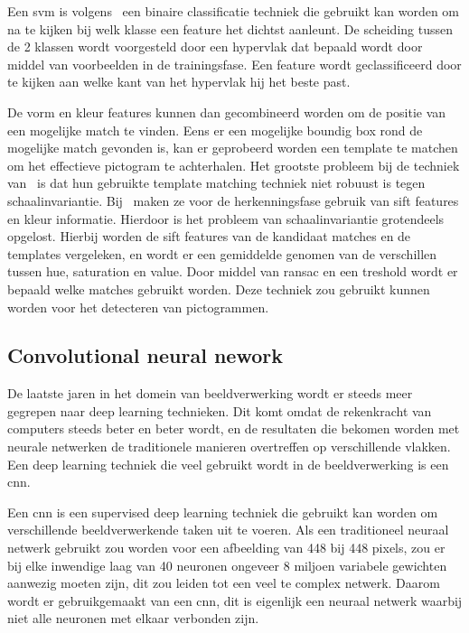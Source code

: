             Een \gls{svm} is volgens~\cite{fradkin2006support} een binaire classificatie techniek die gebruikt kan worden om na te kijken bij welk klasse een feature het dichtst aanleunt.
            De scheiding tussen de 2 klassen wordt voorgesteld door een hypervlak dat bepaald wordt door middel van voorbeelden in de trainingsfase.
            Een feature wordt geclassificeerd door te kijken aan welke kant van het hypervlak hij het beste past.

            De vorm en kleur features kunnen dan gecombineerd worden om de positie van een mogelijke match te vinden. Eens er een mogelijke boundig box rond de mogelijke match gevonden is,
            kan er geprobeerd worden een template te matchen om het effectieve pictogram te achterhalen. Het grootste probleem bij de techniek van~\cite{Fang2003} is
            dat hun gebruikte template matching techniek niet robuust is tegen schaalinvariantie.
            Bij~\cite{Zabihi2017} maken ze voor de herkenningsfase gebruik van \gls{sift}\cite{Lowe1999} features en kleur informatie.
            Hierdoor is het probleem van schaalinvariantie grotendeels opgelost.
            Hierbij worden de \gls{sift} features van de kandidaat matches en de templates vergeleken, en wordt er een gemiddelde genomen van de verschillen tussen hue, saturation en value.
            Door middel van \gls{ransac} en een treshold wordt er bepaald welke matches gebruikt worden. Deze techniek zou gebruikt kunnen worden voor het detecteren van pictogrammen.

        
        \subsection{Convolutional neural nework} \label{sec:yolo}
            De laatste jaren in het domein van beeldverwerking wordt er steeds meer gegrepen naar deep learning technieken.
            Dit komt omdat de rekenkracht van computers steeds beter en beter wordt, en de resultaten die bekomen worden met neurale netwerken de traditionele manieren overtreffen op verschillende vlakken.
            Een deep learning techniek die veel gebruikt wordt in de beeldverwerking is een \gls{cnn}.

            Een \gls{cnn} is een supervised deep learning techniek die gebruikt kan worden om verschillende beeldverwerkende taken uit te voeren.
            Als een traditioneel neuraal netwerk gebruikt zou worden voor een afbeelding van 448 bij 448 pixels, zou er bij elke inwendige laag van 40 neuronen ongeveer 8 miljoen variabele gewichten aanwezig moeten zijn,
            dit zou leiden tot een veel te complex netwerk.
            Daarom wordt er gebruikgemaakt van een \gls{cnn}, dit is eigenlijk een neuraal netwerk waarbij niet alle neuronen met elkaar verbonden zijn.~\cite{lecun1990handwritten}

